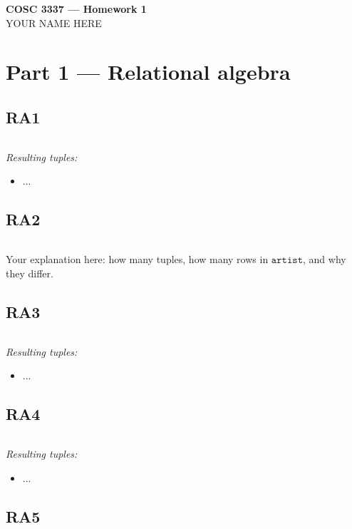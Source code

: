 \documentclass[11pt]{article}
\newcommand{\Select}[2]{\ensuremath{\sigma_{#1}\left(#2\right)}}
\newcommand{\Project}[2]{\ensuremath{\Pi_{#1}\left(#2\right)}}
\newcommand{\Rel}[1]{\ensuremath{\mathtt{#1}}}
\newenvironment{tuples}{\par\medskip\noindent\textit{Resulting tuples:}\begin{itemize}[nosep, leftmargin=1.6em]}{\end{itemize}\medskip}
\newcommand{\student}{YOUR NAME HERE}
\begin{document}
\begin{center}
  {\Large\bfseries COSC 3337 — Homework 1}\\[2pt]
  {\large \student}
\end{center}

\section*{Part 1 — Relational algebra}

\subsection*{RA1}

\[
\]

\begin{tuples}
  \item ...
\end{tuples}

\subsection*{RA2}

\[
\]

Your explanation here: how many tuples, how many rows in \Rel{artist}, and why
they differ.

\subsection*{RA3}

\[
\]

\begin{tuples}
  \item ...
\end{tuples}

\subsection*{RA4}

\[
\]

\begin{tuples}
  \item ...
\end{tuples}

\subsection*{RA5}
\end{document}
